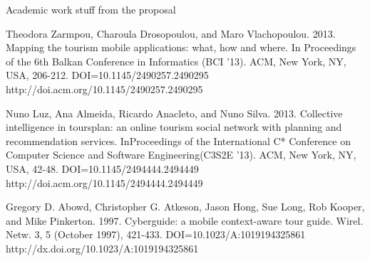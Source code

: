 \documentclass{sigchi}
\begin{document}
Academic work stuff from the proposal

Theodora Zarmpou, Charoula Drosopoulou, and Maro Vlachopoulou. 2013. Mapping the tourism mobile applications: what, how and where. In Proceedings of the 6th Balkan Conference in Informatics (BCI '13). ACM, New York, NY, USA, 206-212. DOI=10.1145/2490257.2490295 http://doi.acm.org/10.1145/2490257.2490295

Nuno Luz, Ana Almeida, Ricardo Anacleto, and Nuno Silva. 2013. Collective intelligence in toursplan: an online tourism social network with planning and recommendation services. InProceedings of the International C* Conference on Computer Science and Software Engineering(C3S2E '13). ACM, New York, NY, USA, 42-48. DOI=10.1145/2494444.2494449 http://doi.acm.org/10.1145/2494444.2494449

Gregory D. Abowd, Christopher G. Atkeson, Jason Hong, Sue Long, Rob Kooper, and Mike Pinkerton. 1997. Cyberguide: a mobile context-aware tour guide. Wirel. Netw. 3, 5 (October 1997), 421-433. DOI=10.1023/A:1019194325861 http://dx.doi.org/10.1023/A:1019194325861



\end{document}
